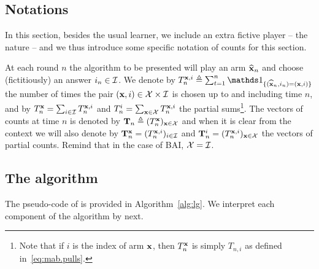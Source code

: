 
\subsection{Notations}

In this section, besides the usual learner, we include an extra fictive player -- the nature -- and we thus introduce some specific notation of counts for this section.

At each round $n$ the algorithm to be presented will play an arm $\widehat{{\bf x}}_n$ and choose (fictitiously) an answer $i_n\in\mathcal{I}$. We denote by $T_n^{\bx,i} \eqdef\sum_{t=1}^n \ind_{\{(\hbx_n,i_n)=(\bx,i)\}}$ the number of times the pair $({\bf x},i)\in\mathcal{X}\times\mathcal{I}$ is chosen up to and including time $n$, and by $T_n^{\bf x} =\sum_{i\in\mathcal{I}} T_n^{{\bf x},i}$ and $T_n^i =\sum_{{\bf x}\in\mathcal{X}} T_n^{{\bf x},i}$ the partial sums\footnote{Note that if $i$ is the index of arm ${\bf x}$, then $T_n^{\bf x}$ is simply $T_{n,i}$ as defined in~\eqref{eq:mab.pulls}.}. The vectors of counts at time $n$ is denoted by ${\bf T}_n \triangleq (T_n^{\bf x})_{{\bf x}\in\mathcal{X}}$
and when it is clear from the context we will also denote by ${\bf T}_n^{{\bf x}} = (T_n^{{\bf x},i})_{i\in\mathcal{I}}$ and ${\bf T}_n^i = (T_n^{{\bf x},i})_{{\bf x}\in\mathcal{X}}$ the vectors of partial counts. Remind that in the case of BAI, $\mathcal{X}=\mathcal{I}$.



\subsection{The \LG{} algorithm}

The pseudo-code of \LG{} is provided in Algorithm~\ref{alg:lg}. We interpret each component of the algorithm by next.

